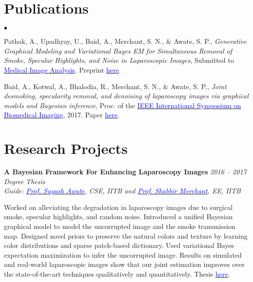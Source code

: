 \documentclass[margin,line,hidelinks]{res}
\newenvironment{list1}{
  \begin{list}{\ding{113}}{%
      \setlength{\itemsep}{0in}
      \setlength{\parsep}{0in} \setlength{\parskip}{0in}
      \setlength{\topsep}{0in} \setlength{\partopsep}{0in} 
      \setlength{\leftmargin}{0.17in}}}{\end{list}}
\newenvironment{list2}{
  \begin{list}{$\bullet$}{%
      \setlength{\itemsep}{0in}
      \setlength{\parsep}{0in} \setlength{\parskip}{0in}
      \setlength{\topsep}{0in} \setlength{\partopsep}{0in} 
      \setlength{\leftmargin}{0.2in}}}{\end{list}}
\begin{document}
\begin{resume}
\section{\sc Publications}
\begin{list2}
\item Pathak, A., Upadhyay, U., Baid, A., Merchant, S. N., \& Awate, S. P., {\em Generative Graphical Modeling and Variational Bayes EM for Simultaneous Removal of Smoke, Specular Highlights, and Noise in Laparoscopic Images}, Submitted to  \href{https://www.journals.elsevier.com/medical-image-analysis}{\textcolor{blue} {Medical Image Analysis}}. Preprint \href{https://drive.google.com/open?id=1w8-2TKftgZ79kkmx5uWLZJTpzZ7d8vum}{\textcolor{blue} {here}}.
\item Baid, A., Kotwal, A., Bhalodia, R., Merchant, S. N., \& Awate, S. P., {\em Joint desmoking, specularity removal, and denoising of laparoscopy images via graphical models and Bayesian inference}, Proc. of the \href{http://biomedicalimaging.org/2017/}{\textcolor{blue} {IEEE International Symposium on Biomedical Imaging}}, 2017. Paper \href{https://ieeexplore.ieee.org/abstract/document/7950623/}{\textcolor{blue} {here}}.
\end{list2}

\section{\sc Research Projects}

{\bf A Bayesian Framework For Enhancing Laparoscopy Images} \hfill {\it 2016 -- 2017} \\
{\em Degree Thesis} \\
{\em Guide: \href{https://www.cse.iitb.ac.in/~suyash}{\textcolor{blue}{Prof. Suyash Awate}}, CSE, IITB and \href{https://www.ee.iitb.ac.in/wiki/faculty/merchant}{\textcolor{blue}{Prof. Shabbir Merchant}}, EE, IITB} \\
\vspace*{-.13in}
\begin{list1}
\item[]
Worked on alleviating the degradation in laparoscopy images due to surgical smoke, specular highlights, and random noise. Introduced a unified Bayesian graphical model to model the uncorrupted image and the smoke transmission map. Designed novel priors to preserve the natural colors and texture by learning color distributions and sparse patch-based dictionary. Used variational Bayes expectation maximization to infer the uncorrupted image. Results on simulated and real-world laparoscopic images show that our joint estimation improves over the state-of-the-art techniques qualitatively and quantitatively. Thesis \href{https://github.com/ayushbaid/masters_thesis/blob/master/mainrep.pdf}{\textcolor{blue} {here}}.
\end{list1}


\end{resume}
\end{document}
